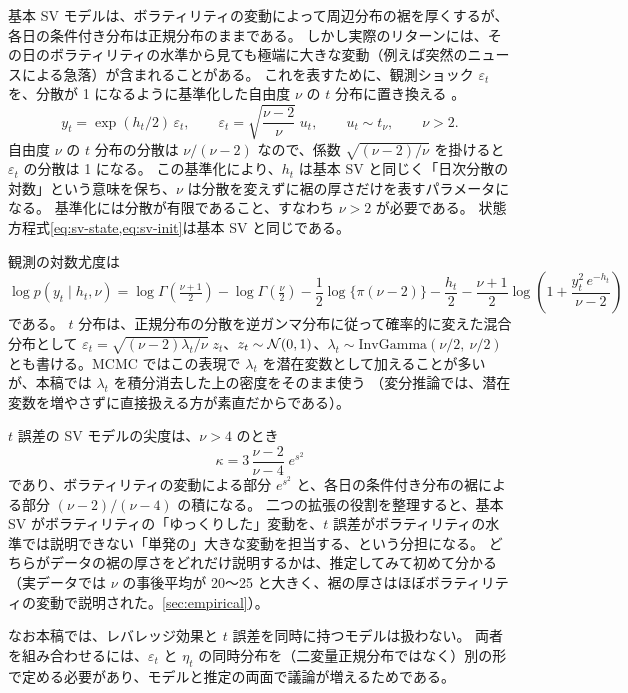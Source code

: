 基本 SV モデルは、ボラティリティの変動によって周辺分布の裾を厚くするが、各日の条件付き分布は正規分布のままである。
しかし実際のリターンには、その日のボラティリティの水準から見ても極端に大きな変動（例えば突然のニュースによる急落）が含まれることがある。
これを表すために、観測ショック $\varepsilon_t$ を、分散が 1 になるように基準化した自由度 $\nu$ の $t$ 分布に置き換える \parencite{chib2002,jacquier2004}。
\begin{equation}
  y_t = \exp(h_t/2)\,\varepsilon_t, \qquad \varepsilon_t = \sqrt{\frac{\nu-2}{\nu}}\; u_t, \qquad u_t \sim t_\nu, \qquad \nu > 2.
  \label{eq:sv-t}
\end{equation}
自由度 $\nu$ の $t$ 分布の分散は $\nu/(\nu-2)$ なので、係数 $\sqrt{(\nu-2)/\nu}$ を掛けると $\varepsilon_t$ の分散は 1 になる。
この基準化により、$h_t$ は基本 SV と同じく「日次分散の対数」という意味を保ち、$\nu$ は分散を変えずに裾の厚さだけを表すパラメータになる。
基準化には分散が有限であること、すなわち $\nu > 2$ が必要である。
状態方程式\cref{eq:sv-state,eq:sv-init}は基本 SV と同じである。

観測の対数尤度は
\[
  \log p(y_t \mid h_t, \nu) = \log \Gamma\!\left(\tfrac{\nu+1}{2}\right) - \log \Gamma\!\left(\tfrac{\nu}{2}\right) - \frac{1}{2}\log\{\pi(\nu-2)\}
    - \frac{h_t}{2} - \frac{\nu+1}{2} \log\!\left(1 + \frac{y_t^2\, e^{-h_t}}{\nu - 2}\right)
\]
である。
$t$ 分布は、正規分布の分散を逆ガンマ分布に従って確率的に変えた混合分布として
$\varepsilon_t = \sqrt{(\nu-2)\lambda_t/\nu}\; z_t$、$z_t \sim \mathcal{N}(0,1)$、$\lambda_t \sim \mathrm{InvGamma}(\nu/2,\ \nu/2)$
とも書ける。MCMC ではこの表現で $\lambda_t$ を潜在変数として加えることが多いが、本稿では $\lambda_t$ を積分消去した上の密度をそのまま使う
（変分推論では、潜在変数を増やさずに直接扱える方が素直だからである）。

$t$ 誤差の SV モデルの尖度は、$\nu > 4$ のとき
\[
  \kappa = 3\,\frac{\nu-2}{\nu-4}\; e^{s^2}
\]
であり、ボラティリティの変動による部分 $e^{s^2}$ と、各日の条件付き分布の裾による部分 $(\nu-2)/(\nu-4)$ の積になる。
二つの拡張の役割を整理すると、基本 SV がボラティリティの「ゆっくりした」変動を、$t$ 誤差がボラティリティの水準では説明できない「単発の」大きな変動を担当する、という分担になる。
どちらがデータの裾の厚さをどれだけ説明するかは、推定してみて初めて分かる（実データでは $\nu$ の事後平均が 20〜25 と大きく、裾の厚さはほぼボラティリティの変動で説明された。\cref{sec:empirical}）。

なお本稿では、レバレッジ効果と $t$ 誤差を同時に持つモデルは扱わない。
両者を組み合わせるには、$\varepsilon_t$ と $\eta_t$ の同時分布を（二変量正規分布ではなく）別の形で定める必要があり、モデルと推定の両面で議論が増えるためである。


